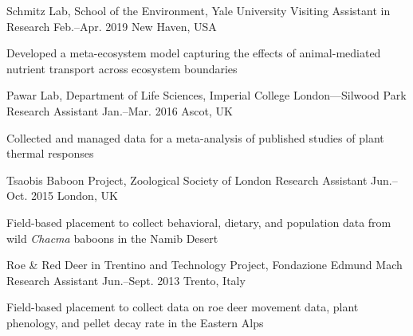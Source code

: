 

\begin{cventries}

  \cventry
    {Schmitz Lab, School of the Environment, Yale University} %
    {Visiting Assistant in Research} %
    {Feb.--Apr. 2019} %
    {New Haven, USA} %
    {
      \begin{cvitems} %
        \item {Developed a meta-ecosystem model capturing the effects of animal-mediated nutrient transport across ecosystem boundaries}
      \end{cvitems}  
    }

  \cventry
    {Pawar Lab, Department of Life Sciences, Imperial College London---Silwood Park} %
    {Research Assistant} %
    {Jan.--Mar. 2016} %
    {Ascot, UK} %
    {
      \begin{cvitems} %
        \item {Collected and managed data for a meta-analysis of published studies of plant thermal responses}
      \end{cvitems}  
    }

  \cventry
    {Tsaobis Baboon Project, Zoological Society of London} %
    {Research Assistant} %
    {Jun.--Oct. 2015} %
    {London, UK} %
    {
       \begin{cvitems} %
        \item {Field-based placement to collect behavioral, dietary, and population data from wild \textit{Chacma} baboons in the Namib Desert}
      \end{cvitems}  
    }

  \cventry
    {Roe \& Red Deer in Trentino and Technology Project, Fondazione Edmund Mach} %
    {Research Assistant} %
    {Jun.--Sept. 2013} %
    {Trento, Italy} %
    {
      \begin{cvitems} %
        \item {Field-based placement to collect data on roe deer movement data, plant phenology, and pellet decay rate in the Eastern Alps}
      \end{cvitems}   
    }


\end{cventries}
